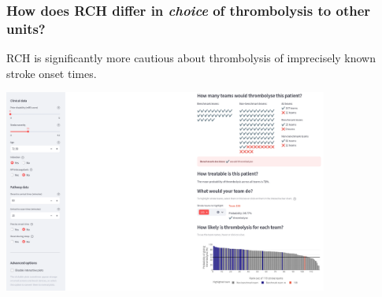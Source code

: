 \begin{frame}
\frametitle{\large{How does RCH differ in \textit{choice} of thrombolysis to other units?}}

\small
RCH is significantly more cautious about thrombolysis of imprecisely known stroke onset times.

\vspace{3mm}
\begin{center}

\includegraphics[width=0.80\textwidth]{./Truro/truro_imprecise}

\small

    
\end{center}


\end{frame}